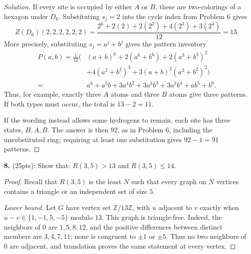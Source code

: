 \documentclass[12pt]{amsart}
\newenvironment{solution}
{\begin{proof}[Solution]}
{\end{proof}}
\begin{document}
\begin{onehalfspace}
        \begin{solution}
            If every site is occupied by either $A$ or $B$, these are
            two-colorings of a hexagon under $D_6$.  Substituting $s_j=2$
            into the cycle index from Problem 6 gives
            \[
                Z(D_6)(2,2,2,2,2,2)
                    =\frac{2^6+2(2)+2(2^2)+4(2^3)+3(2^4)}{12}
                    =13.
            \]
            More precisely, substituting $s_j=a^j+b^j$ gives the pattern
            inventory
            \begin{align*}
                P(a,b)=\frac1{12}\bigl(& (a+b)^6+2(a^6+b^6)
                +2(a^3+b^3)^2\\
                &+4(a^2+b^2)^3+3(a+b)^2(a^2+b^2)^2\bigr)\\
                ={}&a^6+a^5b+3a^4b^2+3a^3b^3
                +3a^2b^4+ab^5+b^6.
            \end{align*}
            Thus, for example, exactly three $A$ atoms and three $B$ atoms
            give three patterns.  If both types must occur, the total is
            $13-2=11$.

            If the wording instead allows some hydrogens to remain, each
            site has three states, $H,A,B$.  The answer is then $92$,
            as in Problem 6, including the unsubstituted ring; requiring
            at least one substitution gives $92-1=91$ patterns.
        \end{solution}

        \noindent\textbf{8.} (25pts): Show that: $R(3, 5) > 13$ and $R(3,5)\le 14$.

        \begin{proof}
            Recall that $R(3,5)$ is the least $N$ such that every graph on
            $N$ vertices contains a triangle or an independent set of size $5$.

            \noindent\emph{Lower bound.}
            Let $G$ have vertex set $\mathbb Z/13\mathbb Z$, with $u$ adjacent
            to $v$ exactly when $u-v\in\{1,-1,5,-5\}$ modulo $13$.
            This graph is triangle-free.  Indeed, the neighbors of $0$ are
            $1,5,8,12$, and the positive differences between distinct members
            are $3,4,7,11$; none is congruent to $\pm1$ or $\pm5$.
            Thus no two neighbors of $0$ are adjacent, and translation
            proves the same statement at every vertex.


\end{proof}
\end{onehalfspace}
\end{document}
